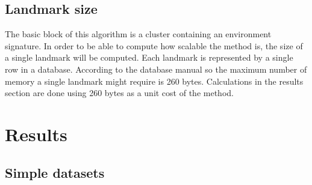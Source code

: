 \documentclass[twoside,hidelinks]{article}
\begin{document}
\subsection{Landmark size}


The basic block of this algorithm is a cluster containing an environment signature. In order to be able to compute how scalable the method is, the size of a single landmark will be computed. Each landmark is represented by a single row in a database\cite{sqlite}. According to the database manual so the maximum number of memory a single landmark might require is 260 bytes. Calculations in the results section are done using 260 bytes as a unit cost of the method. 

\newpage
\section{Results}
\label{sec:results}

\subsection{Simple datasets}
\end{document}
